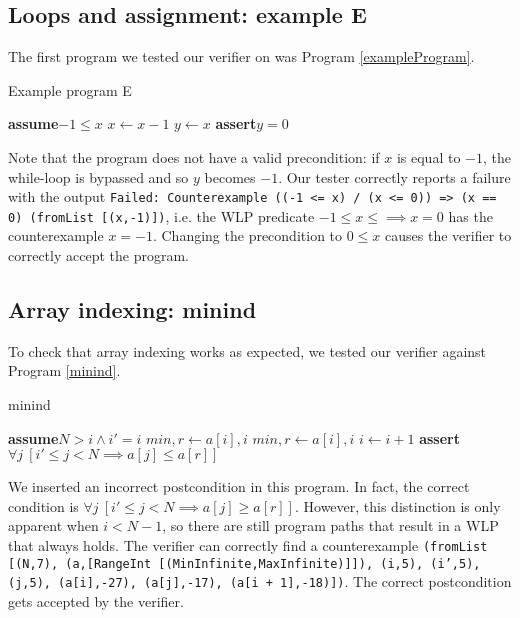 \documentclass[a4paper]{article}
\newcommand{\Assert}{\State\textbf{assert}\xspace}
\newcommand{\Assume}{\State\textbf{assume}\xspace}
\begin{document}
\subsection{Loops and assignment: example E}

The first program we tested our verifier on was Program \ref{exampleProgram}.

\begin{algorithm}\label{exampleProgram}
\caption{Example program E}
\begin{algorithmic}
\Assume $-1 \leq x$
	\State $x \gets x - 1$
\EndWhile
\State $y \gets x$
\Assert $y = 0$
\end{algorithmic}
\end{algorithm}

Note that the program does not have a valid precondition: if $x$ is equal to $-1$, the while-loop is bypassed and so $y$ becomes $-1$. Our tester correctly reports a failure with the output \texttt{Failed: Counterexample ((-1 <= x) /\ (x <= 0)) => (x == 0) (fromList [(x,-1)])}, i.e. the WLP predicate $-1 \leq x \leq \implies x = 0$ has the counterexample $x = -1$. Changing the precondition to $0 \leq x$ causes the verifier to correctly accept the program.

\subsection{Array indexing: minind}

To check that array indexing works as expected, we tested our verifier against Program \ref{minind}.

\begin{algorithm}\label{minind}
\caption{minind}
\begin{algorithmic}
\Assume $N > i \wedge i' = i$
	\State $\textit{min}, r \gets a[i], i$
			\State $\textit{min}, r \gets a[i], i$
		\EndIf
		\State $i \gets i+1$
	\EndWhile
\EndVar
\Assert $\forall j\ [i' \leq j < N \implies a[j] \leq a[r]]$
\end{algorithmic}
\end{algorithm}

We inserted an incorrect postcondition in this program. In fact, the correct condition is $\forall j\ [i' \leq j < N \implies a[j] \geq a[r]]$. However, this distinction is only apparent when $i < N - 1$, so there are still program paths that result in a WLP that always holds. The verifier can correctly find a counterexample \texttt{(fromList [(N,7), (a,[RangeInt [(MinInfinite,MaxInfinite)]]), (i,5), (i',5), (j,5), (a[i],-27), (a[j],-17), (a[i + 1],-18)])}. The correct postcondition gets accepted by the verifier.
\end{document}
